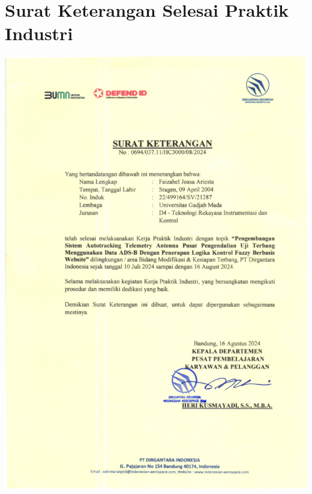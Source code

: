 \section{Surat Keterangan Selesai Praktik Industri}
\includegraphics[scale=0.7]{dokumen/pernyataanSelesai.pdf}

\newpage

